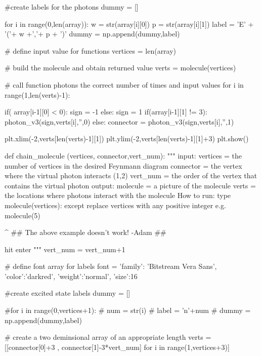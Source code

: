 \documentclass[11pt,a4paper,notitlepage]{article}
\begin{document}
\begin{code}
    #create labels for the photons
    dummy = [] 
      
    for i in range(0,len(array)):
        w = str(array[i][0]) 
        p = str(array[i][1]) 
        label = 'E' + '('+ w +','+ p + ')'
        dummy = np.append(dummy,label)
    
    # define input value for functions
    vertices = len(array)
    
    # build the molecule and obtain returned value
    verts = molecule(vertices)
    
    # call function photons the correct number of times and input values
    for i in range(1,len(verts)-1):
        
        if( array[i-1][0] < 0):
            sign = -1
        else:
            sign = 1
        if(array[i-1][1] != 3):
            photon_v3(sign,verts[i],'',0)  
        else:
            connector = photon_v3(sign,verts[i],'',1)  
        
         
    
    plt.xlim(-2,verts[len(verts)-1][1])
    plt.ylim(-2,verts[len(verts)-1][1]+3)   
    plt.show()

def chain_molecule (vertices, connector,vert_num):
    """
    input:
        vertices = the number of vertices in the desired Feynmann diagram
        connector = the vertex where the virtual photon interacts (1,2)
        vert_num = the order of the vertex that contains the virtual photon
    output:
        molecule = a picture of the molecule
        verts = the locations where photons interact with the molecule
    How to run:
        type molecule(vertices): except replace vertices with any positive 
        integer e.g. molecule(5)
        
        ^ ## The above example doesn't work! -Adam ##
        
        hit enter
    """
    vert_num = vert_num+1
    
    # define font array for labels
    font = {'family': 'Bitstream Vera Sans',
            'color':'darkred',
            'weight':'normal',
            'size':16}

    #create excited state labels       
    dummy = []
    
    #for i in range(0,vertices+1):
    #    num = str(i)
    #    label = 'n'+num
    #    dummy = np.append(dummy,label)
    
    
    # create a two deminsional array of an appropriate length
    verts = [[connector[0]+3 , connector[1]-3*vert_num] for i in range(1,vertices+3)]
    

\end{code}
\end{document}
